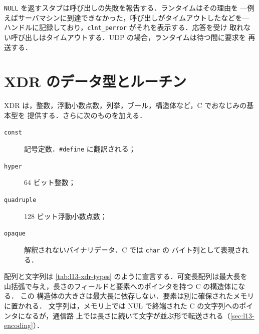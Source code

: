 \documentclass[../main.tex]{subfiles}
\begin{document}
\texttt{NULL} を返すスタブは呼び出しの失敗を報告する．ランタイムはその理由を
---例えばサーバマシンに到達できなかった，呼び出しがタイムアウトしたなどを---
ハンドルに記録しており，\texttt{clnt\_perror} がそれを表示する．応答を受け
取れない呼び出しはタイムアウトする．UDP の場合，ランタイムは待つ間に要求を
再送する．

\section{XDR のデータ型とルーチン}
\label{sec:l13-xdr-types}

XDR は，整数，浮動小数点数，列挙，ブール，構造体など，C でおなじみの基本型を
提供する．さらに次のものを加える．
\begin{description}
  \item[\texttt{const}] 記号定数．\texttt{\#define} に翻訳される；
  \item[\texttt{hyper}] 64 ビット整数；
  \item[\texttt{quadruple}] 128 ビット浮動小数点数；
  \item[\texttt{opaque}] 解釈されないバイナリデータ．C では \texttt{char} の
    バイト列として表現される．
\end{description}
配列と文字列は \cref{tab:l13-xdr-types} のように宣言する．可変長配列は最大長を
山括弧で与え，長さのフィールドと要素へのポインタを持つ C の構造体になる．%
この
構造体の大きさは最大長に依存しない．要素は別に確保されたメモリに置かれる．
文字列は，メモリ上では NUL で終端された C の文字列へのポインタになるが，通信路
上では長さに続いて文字が並ぶ形で転送される（\cref{sec:l13-encoding}）．
\end{document}
